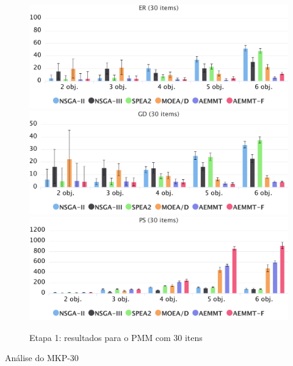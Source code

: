 \begin{figure}[!htbp]
	\caption{Etapa 1: resultados para o PMM com 30 itens}
	\label{fig_exp1_mkp_30}
	\includegraphics[width=1\textwidth]{cap_experimentos/figs/etapa1/er-mkp-30}
	\includegraphics[width=1\textwidth]{cap_experimentos/figs/etapa1/gd-mkp-30}
	\includegraphics[width=1\textwidth]{cap_experimentos/figs/etapa1/ps-mkp-30}
\end{figure}

Análise do MKP-30

